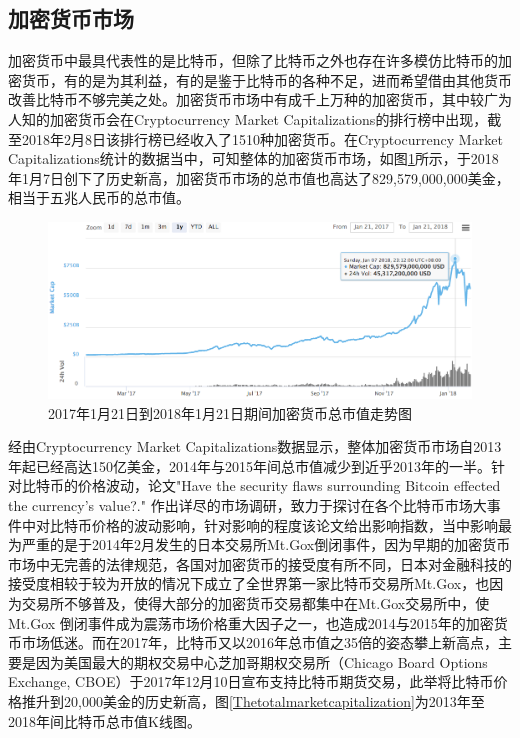 		\subsection{加密货币市场}

		加密货币中最具代表性的是比特币，但除了比特币之外也存在许多模仿比特币的加密货币，有的是为其利益，有的是鉴于比特币的各种不足，进而希望借由其他货币改善⽐特币不够完美之处。加密货币市场中有成千上万种的加密货币，其中较广为人知的加密货币会在Cryptocurrency Market Capitalizations\supercite{CryptocurrencyMarketCapitalizations}的排行榜中出现，截至2018年2月8日该排行榜已经收入了1510种加密货币。在Cryptocurrency Market Capitalizations统计的数据当中，可知整体的加密货币市场，如图\ref{TotalMarketCapitalization}所示，于2018年1月7日创下了历史新高，加密货币市场的总市值也高达了829,579,000,000美金，相当于五兆人民币的总市值。

		\begin{figure}[!htbp]
			\centering
			\includegraphics[width = 1\textwidth]{TotalMarketCapitalization.png}
			\caption{2017年1月21日到2018年1月21日期间加密货币总市值走势图\supercite{CryptocurrencyMarketCapitalizations}}\label{TotalMarketCapitalization}
		\end{figure}

		经由Cryptocurrency Market Capitalizations数据显示，整体加密货币市场自2013年起已经高达150亿美金，2014年与2015年间总市值减少到近乎2013年的一半。针对比特币的价格波动，论文"Have the security flaws surrounding Bitcoin effected the currency's value?."
		\supercite{HavethesecurityflawssurroundingBITCOINeffectedthecurrencysvalue?}
		作出详尽的市场调研，致力于探讨在各个比特币市场大事件中对比特币价格的波动影响，针对影响的程度该论文给出影响指数，当中影响最为严重的是于2014年2月发生的日本交易所Mt.Gox倒闭事件，因为早期的加密货币市场中无完善的法律规范，各国对加密货币的接受度有所不同，日本对金融科技的接受度相较于较为开放的情况下成立了全世界第一家比特币交易所Mt.Gox，也因为交易所不够普及，使得大部分的加密货币交易都集中在Mt.Gox交易所中，使Mt.Gox 倒闭事件成为震荡市场价格重⼤因⼦之⼀，也造成2014与2015年的加密货币市场低迷。而在2017年，比特币又以2016年总市值之35倍的姿态攀上新高点，主要是因为美国最大的期权交易中心芝加哥期权交易所（Chicago Board Options Exchange, CBOE）于2017年12月10日宣布支持比特币期货交易，此举将比特币价格推升到20,000美金的历史新高，图\ref{Thetotalmarketcapitalization}为2013年至2018年间比特币总市值K线图。

